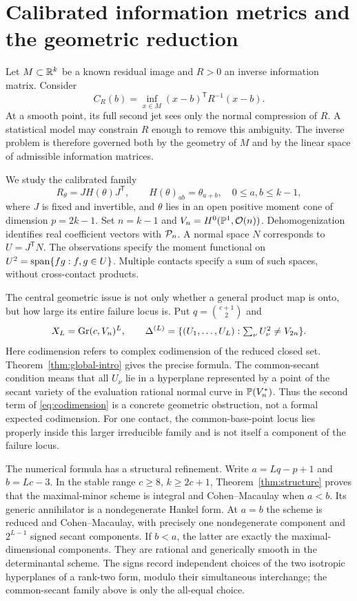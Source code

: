 \section{Calibrated information metrics and the geometric reduction}\label{sec:information-reduction}
Let $M\subset\mathbb R^k$ be a known residual image and $R>0$ an inverse information matrix. Consider
\begin{equation}\label{eq:distance}
 C_R(b)=\inf_{x\in M}(x-b)^{\mathsf T}R^{-1}(x-b).
\end{equation}
At a smooth point, its full second jet sees only the normal compression of $R$. A statistical model may constrain $R$ enough to remove this ambiguity. The inverse problem is therefore governed both by the geometry of $M$ and by the linear space of admissible information matrices.

We study the calibrated family
\[
 R_\theta=JH(\theta)J^{\mathsf T},\qquad
 H(\theta)_{ab}=\theta_{a+b},\quad 0\le a,b\le k-1,
\]
where $J$ is fixed and invertible, and $\theta$ lies in an open positive moment cone of dimension $p=2k-1$. Set $n=k-1$ and $V_n=H^0(\mathbb P^1,\mathcal O(n))$. Dehomogenization identifies real coefficient vectors with $\mathcal P_n$. A normal space $N$ corresponds to $U=J^{\mathsf T}N$. The observations specify the moment functional on $U^2=\operatorname{span}\{fg:f,g\in U\}$. Multiple contacts specify a sum of such spaces, without cross-contact products.

The central geometric issue is not only whether a general product map is onto, but how large its entire failure locus is. Put $q=\binom{c+1}{2}$ and
\[
 X_L=\operatorname{Gr}(c,V_n)^L,\qquad
 \Delta^{(L)}=\{(U_1,\ldots,U_L):\textstyle\sum_\nu U_\nu^2\ne V_{2n}\}.
\]
Here codimension refers to complex codimension of the reduced closed set.
Theorem~\ref{thm:global-intro} gives the precise formula.
The common-secant condition means that all $U_\nu$ lie in a hyperplane represented by a point of the secant variety of the evaluation rational normal curve in $\mathbb P(V_n^*)$. Thus the second term of \eqref{eq:codimension} is a concrete geometric obstruction, not a formal expected codimension. For one contact, the common-base-point locus lies properly inside this larger irreducible family and is not itself a component of the failure locus.

The numerical formula has a structural refinement. Write $a=Lq-p+1$ and $b=Lc-3$. In the stable range $c\ge8$, $k\ge2c+1$, Theorem~\ref{thm:structure} proves that the maximal-minor scheme is integral and Cohen--Macaulay when $a<b$. Its generic annihilator is a nondegenerate Hankel form. At $a=b$ the scheme is reduced and Cohen--Macaulay, with precisely one nondegenerate component and $2^{L-1}$ signed secant components. If $b<a$, the latter are exactly the maximal-dimensional components. They are rational and generically smooth in the determinantal scheme. The signs record independent choices of the two isotropic hyperplanes of a rank-two form, modulo their simultaneous interchange; the common-secant family above is only the all-equal choice.

